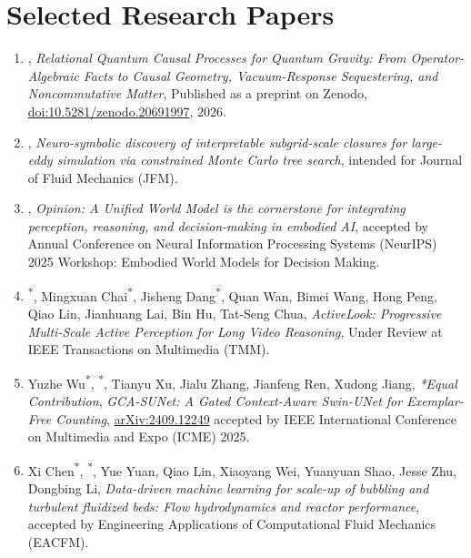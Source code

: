 \section{Selected Research Papers}
\begin{enumerate}[leftmargin=*]
    \item \textbf{\cvName}, \textit{Relational Quantum Causal Processes for Quantum Gravity: From Operator-Algebraic Facts to Causal Geometry, Vacuum-Response Sequestering, and Noncommutative Matter}, Published as a preprint on Zenodo, \href{https://doi.org/10.5281/zenodo.20691997}{doi:10.5281/zenodo.20691997}, 2026.
    \vspace{-0.5em}        
    \item \textbf{\cvName}, \textit{Neuro-symbolic discovery of interpretable subgrid-scale closures for large-eddy simulation via constrained Monte Carlo tree search}, intended for Journal of Fluid Mechanics (JFM).
    \vspace{-0.5em}
    \item \textbf{\cvName}, \textit{Opinion: A Unified World Model is the cornerstone for integrating perception, reasoning, and decision-making in embodied AI}, accepted by Annual Conference on Neural Information Processing Systems (NeurIPS) 2025 Workshop: Embodied World Models for Decision Making.
    \vspace{-0.5em}
    \item \textbf{\cvName}\textsuperscript{*}, Mingxuan Chai\textsuperscript{*}, Jisheng Dang\textsuperscript{*}, Quan Wan, Bimei Wang, Hong Peng, Qiao Lin, Jianhuang Lai, Bin Hu, Tat-Seng Chua, \textit{ActiveLook: Progressive Multi-Scale Active Perception for Long Video Reasoning}, Under Review at IEEE Transactions on Multimedia (TMM).
    \vspace{-0.5em}
    \item Yuzhe Wu\textsuperscript{*}, \textbf{\cvName}\textsuperscript{*}, Tianyu Xu, Jialu Zhang, Jianfeng Ren, Xudong Jiang, \textit{*Equal Contribution}, \textit{GCA-SUNet: A Gated Context-Aware Swin-UNet for Exemplar-Free Counting},   \href{https://arxiv.org/pdf/2409.12249}{arXiv:2409.12249} accepted by IEEE International Conference on Multimedia and Expo (ICME) 2025.
    \vspace{-0.5em}
    \item Xi Chen\textsuperscript{*}, \textbf{\cvName}\textsuperscript{*}, Yue Yuan, Qiao Lin, Xiaoyang Wei, Yuanyuan Shao, Jesse Zhu, Dongbing Li, \textit{Data-driven machine learning for scale-up of bubbling and turbulent fluidized beds: Flow hydrodynamics and reactor performance}, accepted by Engineering Applications of Computational Fluid Mechanics (EACFM).

\end{enumerate}
